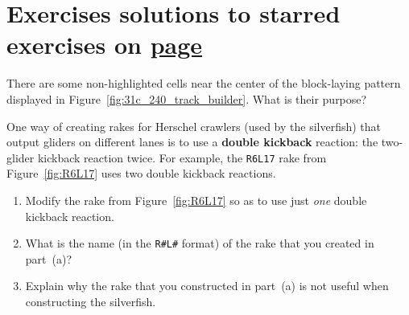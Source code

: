 \section*{Exercises \hfill \normalfont\textsf{\small solutions to starred exercises on \hyperlink{solutions_self_support_spaceships}{page \pageref{solutions_self_support_spaceships}}}}
\label{sec:solutions_self_support_spaceships}
\vspace*{-0.4cm}\hrulefill\vspace*{-0.3cm}\footnotesize\begin{multicols}{2}\vspace*{-0.4cm}\raggedcolumns{}
	\setlength{\parskip}{0pt}\ifdefined\FORPRINTING{}\else%
\fi
	
	
	\begin{problem}\label{exer:self_support_spaceships_track_layer_rephaser} 
		There are some non-highlighted cells near the center of the block-laying pattern displayed in Figure~\ref{fig:31c_240_track_builder}. What is their purpose?
	\end{problem}
	
	
	\mfilbreak
	
	
	\begin{problemstar}\label{exer:self_support_spaceships_r4l1}
		One way of creating rakes for Herschel crawlers (used by the silverfish) that output gliders on different lanes is to use a \textbf{double kickback} reaction: the two-glider kickback reaction twice. For example, the \texttt{R6L17} rake from Figure~\ref{fig:R6L17} uses two double kickback reactions.\smallskip
		
		\begin{enumerate}[label=\bf\color{ocre}(\alph*)]
			\item {} Modify the rake from Figure~\ref{fig:R6L17} so as to use just \emph{one} double kickback reaction.
			
			\item {} What is the name (in the \texttt{R\#L\#} format) of the rake that you created in part~(a)?
			
			\item {} Explain why the rake that you constructed in part~(a) is not useful when constructing the silverfish.
		\end{enumerate}
	\end{problemstar}



\end{multicols}
